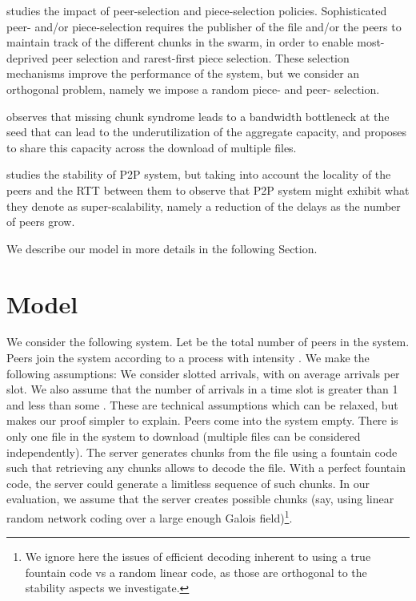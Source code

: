 \documentclass[11pt,conference]{IEEEtran}
\begin{document}
\cite{Menasche2011Implications} studies the impact of peer-selection and piece-selection policies. Sophisticated peer- and/or piece-selection requires the publisher of the file and/or the peers to maintain track of the different chunks in the swarm, in order to enable most-deprived peer selection and rarest-first piece selection. These selection mechanisms improve the performance of the system, but we consider an orthogonal problem, namely we impose a random piece- and peer- selection.

\cite{Zhou2011Stability} observes that missing chunk syndrome leads to a  bandwidth bottleneck at the seed that can lead to the underutilization of the aggregate capacity, and proposes to share this capacity across the download of multiple files.

\cite{baccelli2013p2p} studies the stability of P2P system, but taking into account the locality of the peers and the RTT between them to observe that P2P system might exhibit what they denote as super-scalability, namely a reduction of the delays as the number of peers grow.

We describe our model in more details in the following Section.


\section{Model}
\label{sec:model}

We consider the following system. Let  be the total number of peers in the system. Peers join the system according to a process with intensity . We make the following assumptions: We consider slotted arrivals, with on average  arrivals per slot. We also assume that the number of arrivals in a time slot is greater than 1 and less than some . These are technical assumptions which can be relaxed, but makes our proof simpler to explain. Peers come into the system empty. There is only one file in the system to download (multiple files can be considered independently). The server generates chunks from the file using a fountain code such that retrieving any  chunks allows to decode the file. With a perfect fountain code, the server could generate a limitless sequence of such chunks. In our evaluation, we assume that the server creates  possible chunks (say, using linear random network coding over a large enough Galois field)\footnote{We ignore here the issues of efficient decoding inherent to using a true fountain code vs a random linear code, as those are orthogonal to the stability aspects we investigate.}.
\end{document}
